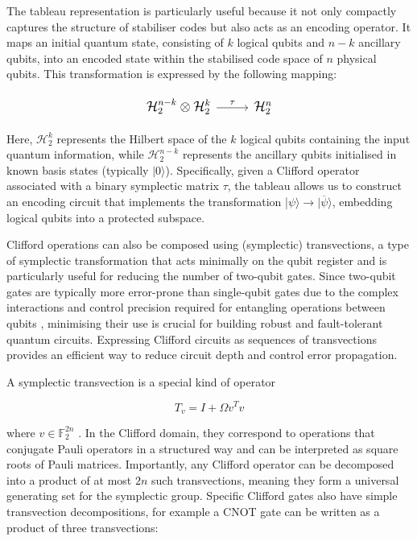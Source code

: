 The tableau representation is particularly useful because it not only compactly captures the structure of stabiliser codes but also acts as an encoding operator. It maps an initial quantum state, consisting of \(k\) logical qubits and \(n-k\) ancillary qubits, into an encoded state within the stabilised code space of \(n\) physical qubits. This transformation is expressed by the following mapping:

\begin{equation}
\begin{large}
\begin{tikzcd}
\mathcal{H}_2^{n-k} \otimes \mathcal{H}_2^k \arrow[r, "\mathcal{\tau}"]  &
\mathcal{H}_2^n
\end{tikzcd}
\end{large}
\end{equation}

Here, \(\mathcal{H}_2^k\)  represents the Hilbert space of the \(k\) logical qubits containing the input quantum information, while \(\mathcal{H}_2^{n-k} \) represents the ancillary qubits initialised in known basis states (typically \(|0\rangle\)). Specifically, given a Clifford operator associated with a binary symplectic matrix \(\tau\), the tableau allows us to construct an encoding circuit that implements the transformation |\(\psi\rangle \rightarrow |\overline{\psi}\rangle\), embedding logical qubits into a protected subspace.

Clifford operations can also be composed using (symplectic) transvections, a type of symplectic transformation that acts minimally on the qubit register and is particularly useful for reducing the number of two-qubit gates. Since two-qubit gates are typically more error-prone than single-qubit gates due to the complex interactions and control precision required for entangling operations between qubits \cite{maldonado2022error}, minimising their use is crucial for building robust and fault-tolerant quantum circuits. Expressing Clifford circuits as sequences of transvections provides an efficient way to reduce circuit depth and control error propagation.

A symplectic transvection is a special kind of operator 

\begin{equation}
\label{eq:transvection definition}
    T_v=I+\Omega v^Tv
\end{equation}

where \(v\in \mathbb{F}_2^{2n} \) \cite{volanto2023minimizing}. In the Clifford domain, they correspond to operations that conjugate Pauli operators in a structured way and can be interpreted as square roots of Pauli matrices. Importantly, any Clifford operator can be decomposed into a product of at most \(2n\) such transvections, meaning they form a universal generating set for the symplectic group. Specific Clifford gates also have simple transvection decompositions, for example a CNOT gate can be written as a product of three transvections:

